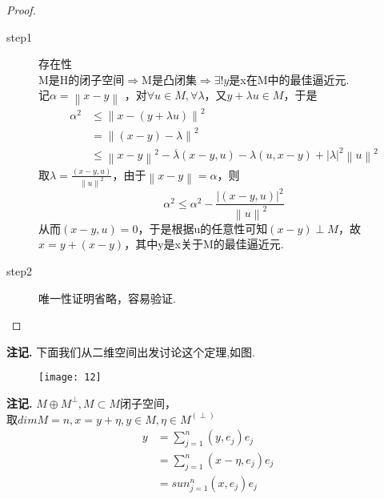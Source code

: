 \documentclass[12pt, a4paper, oneside]{ctexbook}
\newenvironment{note}{\par\noindent\textbf{注记. }}{\par}
\begin{document}
\begin{proof}
\begin{description}
	\item[step1] 存在性\\
	M是H的闭子空间$\Rightarrow$M是凸闭集$\Rightarrow \exists !y$是x在M中的最佳逼近元.\\
	记$\alpha =\left \| x-y\right \|$ ，对$\forall u\in M,\forall \lambda$，又$y+\lambda u\in M$，于是\begin{align*}
		\alpha^2&\leqslant \left \| x-(y+\lambda u)\right \|^2\\
		&=\left \| (x-y)-\lambda\right \|^2\\
		&\leqslant \left \| x-y\right \|^2-\overline{\lambda}(x-y,u)-\lambda(u,x-y)+\left | \lambda\right |^2\left \| u\right \|^2
	\end{align*}
取$\lambda=\frac{(x-y,u)}{\left \| u\right \|^2}$，由于$\left \| x-y\right \|=\alpha$，则\begin{equation*}
	\alpha^2\leqslant \alpha^2-\frac{\left | (x-y,u)\right |^2}{\left \| u\right \|^2}
\end{equation*}
从而$(x-y,u)=0$，于是根据u的任意性可知$(x-y)\perp M$，故$x=y+(x-y)$，其中y是x关于M的最佳逼近元.
\item[step2] 唯一性证明省略，容易验证.
\end{description}
\end{proof}
\begin{note}
下面我们从二维空间出发讨论这个定理,如图.
\begin{figure}
	\centering
	\texttt{[image: 12]}
\end{figure}
\end{note}
\begin{note}
$M\oplus M^{\perp },M\subset M$闭子空间，\\
取$dimM=n,x=y+\eta,y\in M,\eta\in M^(\perp)$
\begin{align*}
	y&=\sum_{j=1}^{n}(y,e_j)e_j\\
	&=\sum_{j=1}^{n}(x-\eta,e_j)e_j\\
	&=sun_{j=1}^{n}(x,e_j)e_j
\end{align*}
\end{note}
\end{document}
